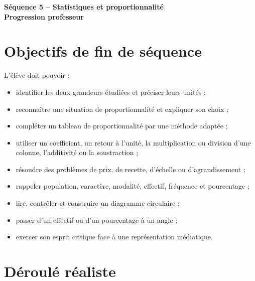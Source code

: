 \documentclass[12pt,a4paper]{article}
\newcommand{\titreseq}[1]{%
\begin{center}
  {\sffamily\LARGE\bfseries\color{TitreC}
  Séquence 5 -- Statistiques et proportionnalité}\\[0.2em]
  {\sffamily\large\bfseries\color{SavoirC}#1}
\end{center}
}
\begin{document}
\titreseq{Progression professeur}


\section*{Objectifs de fin de séquence}

L'élève doit pouvoir :

\begin{itemize}
  \item identifier les deux grandeurs étudiées et préciser leurs unités ;
  \item reconnaître une situation de proportionnalité et expliquer son choix ;
  \item compléter un tableau de proportionnalité par une méthode adaptée ;
  \item utiliser un coefficient, un retour à l'unité, la multiplication ou division
        d'une colonne, l'additivité ou la soustraction ;
  \item résoudre des problèmes de prix, de recette, d'échelle ou d'agrandissement ;
  \item rappeler population, caractère, modalité, effectif, fréquence et pourcentage ;
  \item lire, contrôler et construire un diagramme circulaire ;
  \item passer d'un effectif ou d'un pourcentage à un angle ;
  \item exercer son esprit critique face à une représentation médiatique.
\end{itemize}

\section*{Déroulé réaliste}
\end{document}
